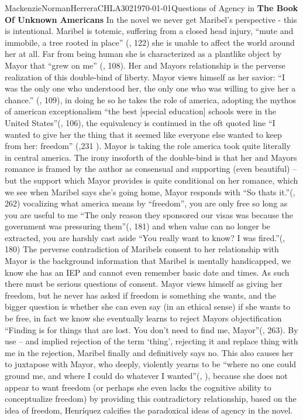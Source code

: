 \documentclass{article}
\begin{document}
\begin{mla}{Mackenzie}{Norman}{Herrera}{CHLA302}{\today}{Questions of Agency in \textbf{The Book Of Unknown Americans}}
In the novel we never get Maribel's perspective - this is intentional. Maribel is totemic, suffering from a closed head injury,  ``mute and immobile, a tree rooted in place'' (\cite{Henriquez2014-sh}, 122) she is unable to affect the world around her at all. Far from being human she is characterized as a plantlike object by Mayor that ``grew on me'' (\cite{Henriquez2014-sh}, 108). Her and Mayors relationship is the perverse realization of this double-bind of liberty. Mayor views himself as her savior: ``I was the only one who understood her, the only one who was willing to give her a chance.'' (\cite{Henriquez2014-sh}, 109), in doing he so he takes the role of america, adopting the mythos of american exceptionalism ``the best [special education] schools were in the United States''(\cite{Henriquez2014-sh}, 106), the equivalency is continued in the oft quoted line ``I wanted to give her the thing that it seemed like everyone else wanted to keep from her: freedom'' (\cite{Henriquez2014-sh},231 ). Mayor is taking the role america took quite literally in central america. The irony insoforth of the double-bind is that her and Mayors romance is framed by the author as consensual and supporting (even beautiful) -- but the support which Mayor provides is quite conditional on her romance, which we see when Maribel says she's going home, Mayor responds with ``So thats it.''(\cite{Henriquez2014-sh}, 262) vocalizing what america means by ``freedom'', you are only free so long as you are useful to me ``The only reason they sponsored our visas was because the government was pressuring them''(\cite{Henriquez2014-sh}, 181) and when value can no longer be extracted, you are harshly cast aside ``You really want to know? I was fired.''(\cite{Henriquez2014-sh}, 180) The perverse contradiction of Maribels consent to her relationship with Mayor is the background information that Maribel is mentally handicapped, we know she has an IEP and cannot even remember basic date and times. As such there must be serious questions of consent. Mayor views himself as giving her freedom, but he never has asked if freedom is something she wants, and the bigger question is whether she can even say (in an ethical sense) if she wants to be free, in fact we know she eventually learns to reject Mayors objectification ``Finding is for things that are lost. You don't need to find me, Mayor''(\cite{Henriquez2014-sh}, 263). By use -- and implied rejection of the term `thing', rejecting it and replace thing with me in the rejection, Maribel finally and definitively says no. This also causes her to juxtapose with Mayor, who deeply, violently yearns to be ``where no one could ground me, and where I could do whatever I wanted''(\cite{Henriquez2014-sh}, ), because she does not appear to want freedom (or perhaps she even lacks the cognitive ability to conceptualize freedom) by providing this contradictory relationship, based on the idea of freedom, Henríquez calcifies the paradoxical ideas of agency in the novel.


\end{mla}
\end{document}

